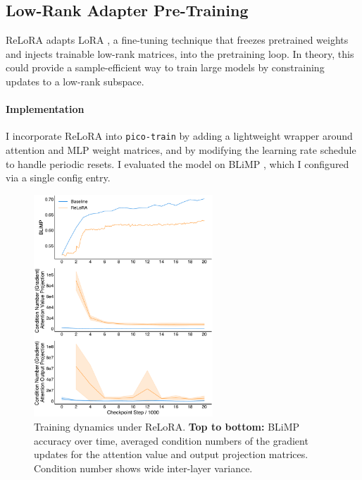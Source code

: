\subsection{Low-Rank Adapter Pre-Training}

ReLoRA \citep{lialin2023relora} adapts LoRA \citep{hu2021lora}, a fine-tuning technique that freezes pretrained weights and injects trainable low-rank matrices, into the pretraining loop. In theory, this could provide a sample-efficient way to train large models by constraining updates to a low-rank subspace. %

\paragraph{Implementation} I incorporate ReLoRA into \texttt{pico-train} by adding a lightweight wrapper around attention and MLP weight matrices, and by modifying the learning rate schedule to handle periodic resets. I evaluated the model on BLiMP \citep{warstadt2020blimp}, which I configured via a single config entry. %

\begin{figure}[h!]
    \centering
    \includegraphics[width=0.6\textwidth]{chapters/pico/figures/relora-example.pdf}
    \caption{Training dynamics under ReLoRA.
    \textbf{Top to bottom:} BLiMP accuracy over time, averaged condition numbers of the gradient updates for the attention value and output projection matrices. Condition number shows wide inter-layer variance.
    }
    \label{fig:relora_example}
\end{figure}

